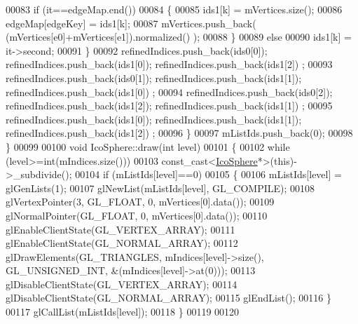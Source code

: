 \begin{DoxyCode}
00083       \textcolor{keywordflow}{if} (it==edgeMap.end())
00084       \{
00085         ids1[k] = mVertices.size();
00086         edgeMap[edgeKey] = ids1[k];
00087         mVertices.push\_back( (mVertices[e0]+mVertices[e1]).normalized() );
00088       \}
00089       \textcolor{keywordflow}{else}
00090         ids1[k] = it->second;
00091     \}
00092     refinedIndices.push\_back(ids0[0]); refinedIndices.push\_back(ids1[0]); refinedIndices.push\_back(ids1[2])
      ;
00093     refinedIndices.push\_back(ids0[1]); refinedIndices.push\_back(ids1[1]); refinedIndices.push\_back(ids1[0])
      ;
00094     refinedIndices.push\_back(ids0[2]); refinedIndices.push\_back(ids1[2]); refinedIndices.push\_back(ids1[1])
      ;
00095     refinedIndices.push\_back(ids1[0]); refinedIndices.push\_back(ids1[1]); refinedIndices.push\_back(ids1[2])
      ;
00096   \}
00097   mListIds.push\_back(0);
00098 \}
00099 
00100 \textcolor{keywordtype}{void} IcoSphere::draw(\textcolor{keywordtype}{int} level)
00101 \{
00102   \textcolor{keywordflow}{while} (level>=\textcolor{keywordtype}{int}(mIndices.size()))
00103     \textcolor{keyword}{const\_cast<}\hyperlink{class_ico_sphere}{IcoSphere}*\textcolor{keyword}{>}(\textcolor{keyword}{this})->\_subdivide();
00104   \textcolor{keywordflow}{if} (mListIds[level]==0)
00105   \{
00106     mListIds[level] = glGenLists(1);
00107     glNewList(mListIds[level], GL\_COMPILE);
00108       glVertexPointer(3, GL\_FLOAT, 0, mVertices[0].data());
00109       glNormalPointer(GL\_FLOAT, 0, mVertices[0].data());
00110       glEnableClientState(GL\_VERTEX\_ARRAY);
00111       glEnableClientState(GL\_NORMAL\_ARRAY);
00112       glDrawElements(GL\_TRIANGLES, mIndices[level]->size(), GL\_UNSIGNED\_INT, &(mIndices[level]->at(0)));
00113       glDisableClientState(GL\_VERTEX\_ARRAY);
00114       glDisableClientState(GL\_NORMAL\_ARRAY);
00115     glEndList();
00116   \}
00117   glCallList(mListIds[level]);
00118 \}
00119 
00120 
\end{DoxyCode}
